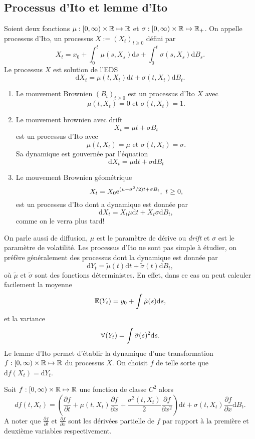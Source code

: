 \subsection{Processus d'Ito et lemme d'Ito}
\begin{definition}
Soient deux fonctions $\mu:[0,\infty)\times\mathbb{R}\mapsto \mathbb{R}$ et $\sigma:[0,\infty)\times\mathbb{R}\mapsto \mathbb{R}_+$. On appelle processus d'Ito, un processus $X:=(X_t)_{t\geq 0}$
 défini par 
 $$
 X_t = x_0 +  \int_0^t\mu(s,X_s)\text{d}s + \int_0^t\sigma(s,X_s)\text{d}B_s.
 $$
Le processus $X$ est solution de l'EDS
$$
\text{d}X_t = \mu(t,X_t)\text{d}t + \sigma(t,X_t)\text{d}B_t.
$$
\end{definition}
\begin{ex}
\begin{enumerate}
	\item Le mouvement Brownien $(B_t)_{t\geq 0}$ est un processus d'Ito $X$ avec 
	$$
	\mu(t,X_t) = 0\text{ et }\sigma(t,X_t) = 1.
	$$
	\item Le mouvement brownien avec drift 
	$$
	X_t = \mu t + \sigma B_t
	$$
	est un processus d'Ito avec 
	$$
	\mu(t,X_t) = \mu\text{ et }\sigma(t,X_t) = \sigma.
	$$
	Sa dynamique est gouvernée par l'équation
	$$
	\text{d}X_t = \mu\text{d}t+\sigma \text{d}B_t
	$$
	\item Le mouvement Brownien géométrique 
	$$
	X_t = X_0\mathrm{e}^{(\mu - \sigma^2/2)t + \sigma B_t},\text{ }t\geq 0,
	$$
	est un processus d'Ito dont a dynamique est donnée par 
	$$
	\text{d}X_t = X_t\mu\text{d}t+X_t\sigma\text{d}B_t,
	$$
	comme on le verra plus tard!
\end{enumerate}
\end{ex}
On parle aussi de diffusion, $\mu$ est le paramètre de dérive ou \textit{drift} et $\sigma$ est le paramètre de volatilité. Les processus d'Ito ne sont pas simple à étudier, on préfère généralement des processus dont la dynamique est donnée par
$$
\text{d}Y_t = \tilde{\mu}(t)\text{d}t+ \tilde{\sigma}(t)\text{d}B_t,
$$
où $\tilde{\mu}$ et $\tilde{\sigma}$ sont des fonctions déterministes. En effet, dans ce cas on peut calculer facilement la moyenne 
$$
\mathbb{E}(Y_t) = y_0 + \int\tilde{\mu}(s)\text{d}s,
$$
et la variance
$$
\mathbb{V}(Y_t) = \int\tilde{\sigma}(s)^2\text{d}s.
$$
Le lemme d'Ito permet d'établir la dynamique d'une transformation $f:[0,\infty)\times\mathbb{R}\mapsto \mathbb{R}$ du processus $X$. On choisit $f$ de telle sorte que $\text{d}f(X_t) = \text{d}Y_t$.
\begin{theo}
Soit $f:[0,\infty)\times\mathbb{R}\mapsto \mathbb{R}$ une fonction de classe $C^2$ alors 
$$
df(t,X_t) = \left(\frac{\partial f}{\partial t} + \mu(t,X_t)\frac{\partial f}{\partial x}+\frac{\sigma^2(t,X_t)}{2}\frac{\partial f}{\partial x^2}\right)\text{d}t + \sigma(t,X_t)\frac{\partial f}{\partial x}\text{d}B_t.
$$
A noter que $\frac{\partial f}{\partial t}$ et $\frac{\partial f}{\partial x}$ sont les dérivées partielle de $f$ par rapport à la première et deuxième variables respectivement.
\end{theo}
